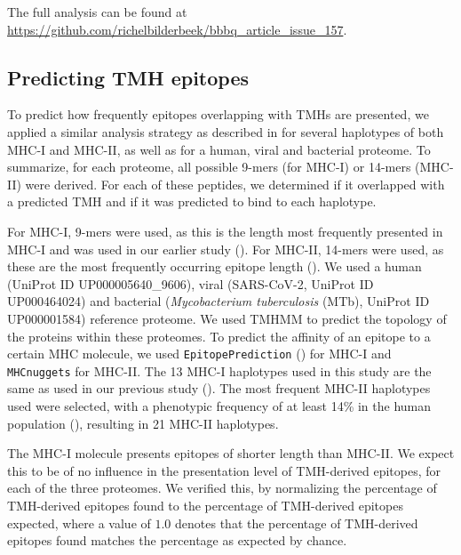 The full analysis can be found
at \url{https://github.com/richelbilderbeek/bbbq_article_issue_157}.

\subsection{Predicting TMH epitopes}

To predict how frequently epitopes overlapping with TMHs are presented,
we applied a similar analysis strategy as described in \cite{bianchi2017} for several haplotypes of both MHC-I and MHC-II, 
as well as for a human, viral and bacterial proteome.
To summarize, for each proteome, 
all possible 9-mers (for MHC-I) or 14-mers (MHC-II) were derived. 
For each of these peptides, we determined if it overlapped with a predicted 
TMH and if it was predicted to bind to each haplotype.

For MHC-I, 9-mers were used, as this is the length most frequently presented in MHC-I and was used in our earlier
study (\cite{bianchi2017}). For MHC-II, 14-mers were used,  as these are the most frequently occurring
epitope length (\cite{bergseng2015different}).
We used a human (UniProt ID UP000005640\_9606), 
viral (SARS-CoV-2, UniProt ID UP000464024) 
and bacterial (\emph{Mycobacterium tuberculosis} (MTb), UniProt ID UP000001584) 
reference proteome. We used TMHMM   to predict the topology 
of the proteins within these proteomes.
To predict the affinity of an epitope to a certain MHC molecule,
we used \verb;EpitopePrediction; (\cite{bianchi2017}) for MHC-I 
and \verb;MHCnuggets;  for MHC-II.
The 13 MHC-I haplotypes used in this study are the same as 
used in our previous study (\cite{bianchi2017}).
The most frequent MHC-II haplotypes used  were selected, with a phenotypic frequency of at least 14\% in
the human population (\cite{greenbaum2011functional}),
resulting in 21 MHC-II haplotypes.

The MHC-I molecule presents epitopes of shorter length than MHC-II.
We expect this to be of no influence in the presentation level
of TMH-derived epitopes, for each of the three proteomes.
We verified this, by normalizing the percentage of TMH-derived epitopes found
to the percentage of TMH-derived epitopes expected, 
where a value of $1.0$ denotes that the percentage of TMH-derived epitopes found
matches the percentage as expected by chance.


